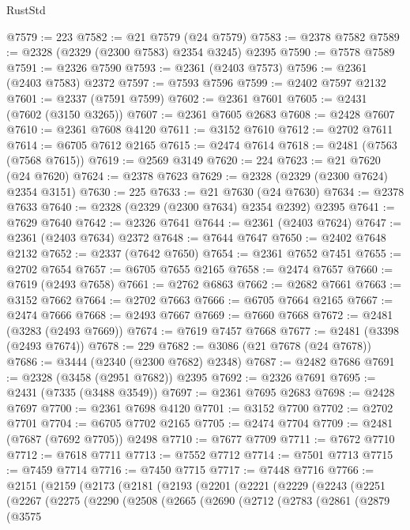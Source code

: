 \begin{lexlean}{RustStd}
\begin{coremodule}
@7579 := 223
@7582 := @21 @7579 (@24 @7579)
@7583 := @2378 @7582
@7589 := @2328 (@2329 (@2300 @7583) @2354 @3245) @2395
@7590 := @7578 @7589
@7591 := @2326 @7590
@7593 := @2361 (@2403 @7573)
@7596 := @2361 (@2403 @7583) @2372
@7597 := @7593 @7596
@7599 := @2402 @7597 @2132
@7601 := @2337 (@7591 @7599)
@7602 := @2361 @7601
@7605 := @2431 (@7602 (@3150 @3265))
@7607 := @2361 @7605 @2683
@7608 := @2428 @7607
@7610 := @2361 @7608 @4120
@7611 := @3152 @7610
@7612 := @2702 @7611
@7614 := @6705 @7612 @2165
@7615 := @2474 @7614
@7618 := @2481 (@7563 (@7568 @7615))
@7619 := @2569 @3149
@7620 := 224
@7623 := @21 @7620 (@24 @7620)
@7624 := @2378 @7623
@7629 := @2328 (@2329 (@2300 @7624) @2354 @3151)
@7630 := 225
@7633 := @21 @7630 (@24 @7630)
@7634 := @2378 @7633
@7640 := @2328 (@2329 (@2300 @7634) @2354 @2392) @2395
@7641 := @7629 @7640
@7642 := @2326 @7641
@7644 := @2361 (@2403 @7624)
@7647 := @2361 (@2403 @7634) @2372
@7648 := @7644 @7647
@7650 := @2402 @7648 @2132
@7652 := @2337 (@7642 @7650)
@7654 := @2361 @7652 @7451
@7655 := @2702 @7654
@7657 := @6705 @7655 @2165
@7658 := @2474 @7657
@7660 := @7619 (@2493 @7658)
@7661 := @2762 @6863
@7662 := @2682 @7661
@7663 := @3152 @7662
@7664 := @2702 @7663
@7666 := @6705 @7664 @2165
@7667 := @2474 @7666
@7668 := @2493 @7667
@7669 := @7660 @7668
@7672 := @2481 (@3283 (@2493 @7669))
@7674 := @7619 @7457 @7668
@7677 := @2481 (@3398 (@2493 @7674))
@7678 := 229
@7682 := @3086 (@21 @7678 (@24 @7678))
@7686 := @3444 (@2340 (@2300 @7682) @2348)
@7687 := @2482 @7686
@7691 := @2328 (@3458 (@2951 @7682)) @2395
@7692 := @2326 @7691
@7695 := @2431 (@7335 (@3488 @3549))
@7697 := @2361 @7695 @2683
@7698 := @2428 @7697
@7700 := @2361 @7698 @4120
@7701 := @3152 @7700
@7702 := @2702 @7701
@7704 := @6705 @7702 @2165
@7705 := @2474 @7704
@7709 := @2481 (@7687 (@7692 @7705)) @2498
@7710 := @7677 @7709
@7711 := @7672 @7710
@7712 := @7618 @7711
@7713 := @7552 @7712
@7714 := @7501 @7713
@7715 := @7459 @7714
@7716 := @7450 @7715
@7717 := @7448 @7716
@7766 := @2151
    (@2159
      (@2173
        (@2181
          (@2193
            (@2201
              (@2221
                (@2229
                  (@2243
                    (@2251
                      (@2267
                        (@2275
                          (@2290
                            (@2508
                              (@2665
                                (@2690
                                  (@2712
                                    (@2783
                                      (@2861
                                        (@2879
                                          (@3575

\end{coremodule}
\end{lexlean}
